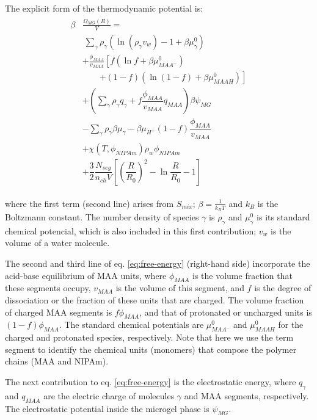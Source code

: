 The explicit form of the thermodynamic potential is: 
%
\begin{align}
\begin{aligned}
\beta&\frac{\Omega_{MG}(R)}{V}=\\& ~ \sum_{\gamma} \rho_\gamma\left(\ln\left(\rho_\gamma v_w\right) -1 + \beta\mu^0_\gamma\right) \\
& + \frac{\phi_{MAA}}{v_{MAA}} \left[f(\ln f+ \beta\mu^0_{MAA^-})\right.\\
&\qquad\left.+(1-f)(\ln (1-f)+\beta\mu^0_{MAAH})\right] \\
%
& +  \left(\sum_{\gamma } {\rho_\gamma q_\gamma + f\dfrac{\phi_{MAA}}{v_{MAA}}q_{MAA}}\right)\beta\psi_{MG}\\
%
& -\sum_{\gamma }{\rho_\gamma\beta\mu_\gamma}
 -\beta\mu_{H^+}(1-f)\dfrac{\phi_{MAA}}{v_{MAA}}\\
%
& + \chi (T, \phi_{NIPAm})\rho_w \phi_{NIPAm} \\
%
& + \dfrac{3}{2}\dfrac{N_{seg}}{n_{ch} V}\left[\left(\dfrac{R}{R_0}\right)^2 - \ln\dfrac{R}{R_0} -1\right]
%
\end{aligned}
\label{eq:free-energy}
\end{align}


\noindent where the first term (second line) arises from $S_{mix}$; $\beta=\frac{1}{k_BT}$ and $k_B$ is the Boltzmann constant.
The number density of species $\gamma$ is $\rho_\gamma$ and $\mu^0_\gamma$ is its  standard chemical potencial, which is also included in this first contribution; $v_w$ is the volume of a water molecule.



The second and third line of eq. \ref{eq:free-energy} (right-hand side) incorporate the acid-base equilibrium of MAA units, where $\phi_{MAA}$ is the volume fraction that these segments occupy, $v_{MAA}$ is the volume of this segment, and $f$ is the degree of dissociation or the fraction of these units that are charged.
The volume fraction of charged MAA segments is $f\phi_{MAA}$, and that of protonated or uncharged units is $(1-f)\phi_{MAA}$.
The standard chemical potentials are $\mu^0_{MAA^-}$ and $\mu^0_{MAAH}$ for the charged and protonated species, respectively.
Note that here we use the term segment to identify the chemical units (monomers) that compose the polymer chains (MAA and NIPAm).


The next contribution to eq. \ref{eq:free-energy} is the electrostatic energy, where $q_\gamma$ and  $q_{MAA}$ are the electric charge of molecules $\gamma$ and MAA segments, respectively. 
The electrostatic potential inside the microgel phase is $\psi_{MG}$.


